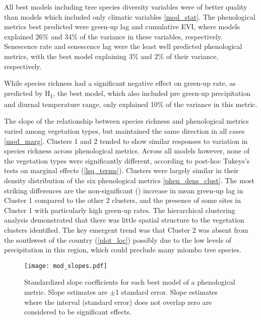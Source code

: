 \documentclass[11pt,a4paper]{article}
\begin{document}
All best models including tree species diversity variables were of better quality than models which included only climatic variables \autoref{mod_stat}. The phenological metrics best predicted were green-up lag and cumulative EVI, where models explained 26\% and 34\% of the variance in these variables, respectively. Senescence rate and senescence lag were the least well predicted phenological metrics, with the best model explaining 3\% and 2\% of their variance, respectively.

While species richness had a significant negative effect on green-up rate, as predicted by H\textsubscript{1}, the best model, which also included pre green-up precipitation and diurnal temperature range, only explained 10\% of the variance in this metric. 

The slope of the relationship between species richness and phenological metrics varied among vegetation types, but maintained the same direction in all cases \autoref{mod_marg}. Clusters 1 and 2 tended to show similar responses to variation in species richness across phenological metrics. Across all models however, none of the vegetation types were significantly different, according to post-hoc Tukeys's tests on marginal effects (\autoref{lsq_terms}). Clusters were largely similar in their density distribution of the six phenological metrics \autoref{phen_dens_clust}. The most striking differences are the non-significant () increase in mean green-up lag in Cluster 1 compared to the other 2 clusters, and the presence of some sites in Cluster 1 with particularly high green-up rates. The hierarchical clustering analysis demonstrated that there was little spatial structure to the vegetation clusters identified. The key emergent trend was that Cluster 2 was absent from the southwest of the country (\autoref{plot_loc}) possibly due to the low levels of precipitation in this region, which could preclude many miombo tree species.



 

\begin{figure}[H]
\centering
	\texttt{[image: mod\_slopes.pdf]}
	\caption{Standardized slope coefficients for each best model of a phenological metric. Slope estimates are $\pm$1 standard error. Slope estimates where the interval (standard error) does not overlap zero are considered to be significant effects.}
	\label{mod_slopes}
\end{figure}
\end{document}
